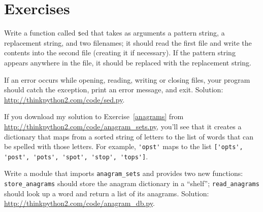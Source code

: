 \documentclass[
DIV=11,
fontsize=12,
twoside,
headinclude=false,
titlepage=firstiscover,
abstract=true,
headsepline=true,
footsepline=true,
chapterprefix=true, %
headings=big,
bibliography=totoc,%
captions=tableheading
]{scrbook}
\theoremstyle{definition}
\begin{document}
\section{Exercises}

\begin{exercise}
\normalfont

Write a function called {\texttt sed} that takes as arguments a pattern string,
a replacement string, and two filenames; it should read the first file
and write the contents into the second file (creating it if
necessary).  If the pattern string appears anywhere in the file, it
should be replaced with the replacement string.

If an error occurs while opening, reading, writing or closing files,
your program should catch the exception, print an error message, and
exit.  Solution: \url{http://thinkpython2.com/code/sed.py}.

\end{exercise}


\begin{exercise}
\normalfont
{}

If you download my solution to Exercise~\ref{anagrams} from
\url{http://thinkpython2.com/code/anagram_sets.py}, you'll see that it creates
a dictionary that maps from a sorted string of letters to the list of
words that can be spelled with those letters.  For example,
\verb"'opst'" maps to the list
\verb"['opts', 'post', 'pots', 'spot', 'stop', 'tops']".

Write a module that imports \verb"anagram_sets" and provides
two new functions: \verb"store_anagrams" should store the
anagram dictionary in a ``shelf''; \verb"read_anagrams" should
look up a word and return a list of its anagrams.
Solution: \url{http://thinkpython2.com/code/anagram_db.py}.

\end{exercise}
\end{document}
